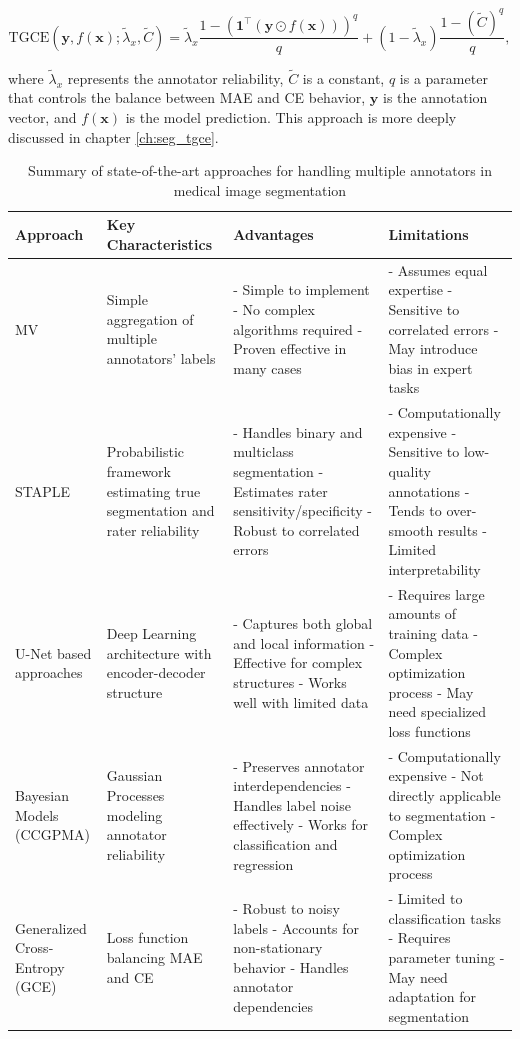 \begin{equation}
  \text{TGCE}(\mathbf{y}, f(\mathbf{x}); \tilde{\lambda}_x,
  \tilde{C}) = \tilde{\lambda}_x \frac{1-(\mathbf{1}^\top(\mathbf{y}
  \odot f(\mathbf{x})))^q}{q} + (1-\tilde{\lambda}_x)\frac{1-(\tilde{C})^q}{q},
\end{equation}

where $\tilde{\lambda}_x$ represents the annotator reliability,
$\tilde{C}$ is a constant, $q$ is a parameter that controls the
balance between MAE and CE behavior, $\mathbf{y}$ is the annotation
vector, and $f(\mathbf{x})$ is the model prediction. This approach is
more deeply discussed in chapter \ref{ch:seg_tgce}.

\begin{table}[htbp]
  \centering
  \caption{Summary of state-of-the-art approaches for handling
  multiple annotators in medical image segmentation}
  \label{tab:state_of_art_summary}
  \begin{tabular}{p{}p{}p{}p{}}
    \toprule
    \textbf{Approach} & \textbf{Key Characteristics} &
    \textbf{Advantages} & \textbf{Limitations} \\
    \midrule
    \gls{MV} \cite{LamAndSuen1997} & Simple aggregation
    of multiple annotators' labels &
    - Simple to implement
    - No complex algorithms required
    - Proven effective in many cases &
    - Assumes equal expertise
    - Sensitive to correlated errors
    - May introduce bias in expert tasks \\
    \midrule
    STAPLE \cite{WarfieldEtAl2004} & Probabilistic framework
    estimating true segmentation and
    rater reliability &
    - Handles binary and multiclass segmentation
    - Estimates rater sensitivity/specificity
    - Robust to correlated errors &
    - Computationally expensive
    - Sensitive to low-quality annotations
    - Tends to over-smooth results
    - Limited interpretability \\
    \midrule
    U-Net based approaches \cite{RonnebergerEtAl2015} & Deep Learning
    architecture with
    encoder-decoder structure &
    - Captures both global and local information
    - Effective for complex structures
    - Works well with limited data &
    - Requires large amounts of training data
    - Complex optimization process
    - May need specialized loss functions \\
    \midrule
    Bayesian Models (CCGPMA) \cite{GilGonzalezEtAl2023} & Gaussian
    Processes modeling annotator
    reliability &
    - Preserves annotator interdependencies
    - Handles label noise effectively
    - Works for classification and regression &
    - Computationally expensive
    - Not directly applicable to segmentation
    - Complex optimization process \\
    \midrule
    Generalized Cross-Entropy (GCE) \cite{ZhangEtAl2018} & Loss
    function balancing MAE and CE &
    - Robust to noisy labels
    - Accounts for non-stationary behavior
    - Handles annotator dependencies &
    - Limited to classification tasks
    - Requires parameter tuning
    - May need adaptation for segmentation \\
    \bottomrule
  \end{tabular}
\end{table}
